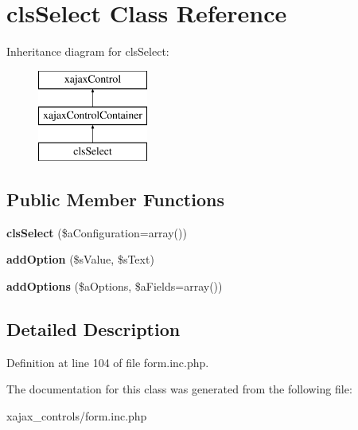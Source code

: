 \hypertarget{classclsSelect}{
\section{clsSelect Class Reference}
\label{classclsSelect}
}
Inheritance diagram for clsSelect:\begin{figure}[H]
\begin{center}
\leavevmode
\includegraphics[height=3.000000cm]{classclsSelect}
\end{center}
\end{figure}
\subsection*{Public Member Functions}
\begin{DoxyCompactItemize}
\item 
\hypertarget{classclsSelect_a86fa5144ecfa496df6eff99b35fe9daa}{
{\bfseries clsSelect} (\$aConfiguration=array())}
\label{classclsSelect_a86fa5144ecfa496df6eff99b35fe9daa}

\item 
\hypertarget{classclsSelect_ab8c33ff606c98928bbdf014d2ec8fdd8}{
{\bfseries addOption} (\$sValue, \$sText)}
\label{classclsSelect_ab8c33ff606c98928bbdf014d2ec8fdd8}

\item 
\hypertarget{classclsSelect_adc86a9f79d2016f96526c7ede0ac9f1d}{
{\bfseries addOptions} (\$aOptions, \$aFields=array())}
\label{classclsSelect_adc86a9f79d2016f96526c7ede0ac9f1d}

\end{DoxyCompactItemize}


\subsection{Detailed Description}


Definition at line 104 of file form.inc.php.



The documentation for this class was generated from the following file:\begin{DoxyCompactItemize}
\item 
xajax\_\-controls/form.inc.php\end{DoxyCompactItemize}
